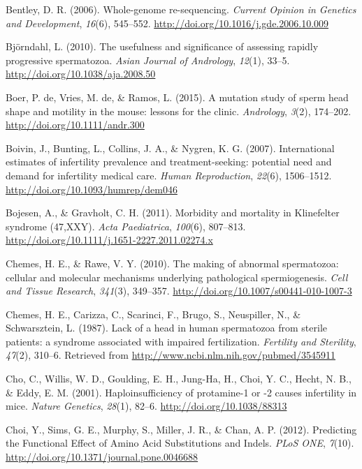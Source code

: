 \documentclass[12pt,twoside]{reedthesis}
\theoremstyle{definition}
\theoremstyle{definition}
\theoremstyle{remark}
\begin{document}
  \hypertarget{ref-Bentley2006}{}
  Bentley, D. R. (2006). Whole-genome re-sequencing. \emph{Current Opinion
  in Genetics and Development}, \emph{16}(6), 545--552.
  \url{http://doi.org/10.1016/j.gde.2006.10.009}
  
  \hypertarget{ref-Bjorndahl2010}{}
  Björndahl, L. (2010). The usefulness and significance of assessing
  rapidly progressive spermatozoa. \emph{Asian Journal of Andrology},
  \emph{12}(1), 33--5. \url{http://doi.org/10.1038/aja.2008.50}
  
  \hypertarget{ref-DeBoer2015}{}
  Boer, P. de, Vries, M. de, \& Ramos, L. (2015). A mutation study of
  sperm head shape and motility in the mouse: lessons for the clinic.
  \emph{Andrology}, \emph{3}(2), 174--202.
  \url{http://doi.org/10.1111/andr.300}
  
  \hypertarget{ref-Boivin2007a}{}
  Boivin, J., Bunting, L., Collins, J. A., \& Nygren, K. G. (2007).
  International estimates of infertility prevalence and treatment-seeking:
  potential need and demand for infertility medical care. \emph{Human
  Reproduction}, \emph{22}(6), 1506--1512.
  \url{http://doi.org/10.1093/humrep/dem046}
  
  \hypertarget{ref-Bojesen2011}{}
  Bojesen, A., \& Gravholt, C. H. (2011). Morbidity and mortality in
  Klinefelter syndrome (47,XXY). \emph{Acta Paediatrica}, \emph{100}(6),
  807--813. \url{http://doi.org/10.1111/j.1651-2227.2011.02274.x}
  
  \hypertarget{ref-Chemes2010}{}
  Chemes, H. E., \& Rawe, V. Y. (2010). The making of abnormal
  spermatozoa: cellular and molecular mechanisms underlying pathological
  spermiogenesis. \emph{Cell and Tissue Research}, \emph{341}(3),
  349--357. \url{http://doi.org/10.1007/s00441-010-1007-3}
  
  \hypertarget{ref-Chemes1987}{}
  Chemes, H. E., Carizza, C., Scarinci, F., Brugo, S., Neuspiller, N., \&
  Schwarsztein, L. (1987). Lack of a head in human spermatozoa from
  sterile patients: a syndrome associated with impaired fertilization.
  \emph{Fertility and Sterility}, \emph{47}(2), 310--6. Retrieved from
  \url{http://www.ncbi.nlm.nih.gov/pubmed/3545911}
  
  \hypertarget{ref-Cho2001}{}
  Cho, C., Willis, W. D., Goulding, E. H., Jung-Ha, H., Choi, Y. C.,
  Hecht, N. B., \& Eddy, E. M. (2001). Haploinsufficiency of protamine-1
  or -2 causes infertility in mice. \emph{Nature Genetics}, \emph{28}(1),
  82--6. \url{http://doi.org/10.1038/88313}
  
  \hypertarget{ref-Choi2012}{}
  Choi, Y., Sims, G. E., Murphy, S., Miller, J. R., \& Chan, A. P. (2012).
  Predicting the Functional Effect of Amino Acid Substitutions and Indels.
  \emph{PLoS ONE}, \emph{7}(10).
  \url{http://doi.org/10.1371/journal.pone.0046688}
  
\end{document}
